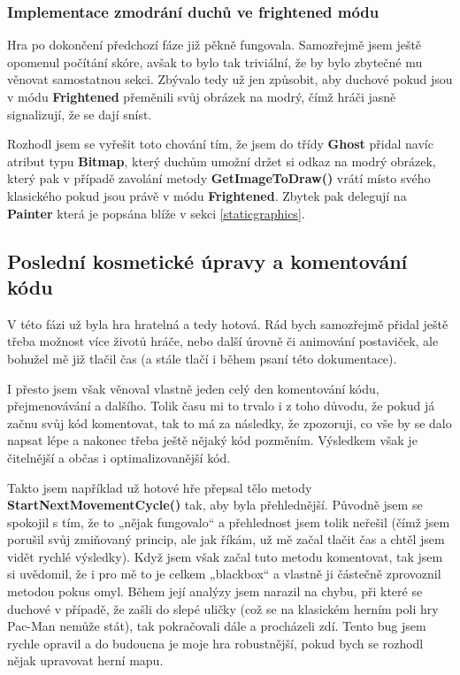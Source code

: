 \documentclass[a4]{article}
\begin{document}
\subsubsection{Implementace zmodrání duchů ve frightened módu} \label{frightenedmode}
Hra po dokončení předchozí fáze již pěkně fungovala. Samozřejmě jsem ještě opomenul počítání skóre, avšak to bylo tak triviální, že by bylo zbytečné mu věnovat samostatnou sekci. Zbývalo tedy už jen způsobit, aby duchové pokud jsou v módu \textbf{Frightened} přeměnili svůj obrázek na modrý, čímž hráči jasně signalizují, že se dají sníst. 

Rozhodl jsem se vyřešit toto chování tím, že jsem do třídy \textbf{Ghost} přidal navíc atribut typu \textbf{Bitmap}, který duchům umožní držet si odkaz na modrý obrázek, který pak v případě zavolání metody \textbf{GetImageToDraw()} vrátí místo svého klasického pokud jsou právě v módu \textbf{Frightened}. Zbytek pak delegují na \textbf{Painter} která je popsána blíže v sekci \ref{staticgraphics}.

\subsection{Poslední kosmetické úpravy a komentování kódu}
V této fázi už byla hra hratelná a tedy hotová. Rád bych samozřejmě přidal ještě třeba možnost více životů hráče, nebo další úrovně či animování postaviček, ale bohužel mě již tlačil čas (a stále tlačí i během psaní této dokumentace). 

I přesto jsem však věnoval vlastně jeden celý den komentování kódu, přejmenovávání a dalšího. Tolik času mi to trvalo i z toho důvodu, že pokud já začnu svůj kód komentovat, tak to má za následky, že zpozoruji, co vše by se dalo napsat lépe a nakonec třeba ještě nějaký kód pozměním. Výsledkem však je čitelnější a občas i optimalizovanější kód. 

Takto jsem například už hotové hře přepsal tělo metody \textbf{StartNextMovementCycle()} tak, aby byla přehlednější. Původně jsem se spokojil s tím, že to „nějak fungovalo“ a přehlednost jsem tolik neřešil (čímž jsem porušil svůj zmiňovaný princip, ale jak říkám, už mě začal tlačit čas a chtěl jsem vidět rychlé výsledky). Když jsem však začal tuto metodu komentovat, tak jsem si uvědomil, že i pro mě to je celkem „blackbox“ a vlastně ji částečně zprovoznil metodou pokus omyl. Během její analýzy jsem narazil na chybu, při které se duchové v případě, že zašli do slepé uličky (což se na klasickém herním poli hry Pac-Man nemůže stát), tak pokračovali dále a procházeli zdí. Tento bug jsem rychle opravil a do budoucna je moje hra robustnější, pokud bych se rozhodl nějak upravovat herní mapu.
\end{document}
